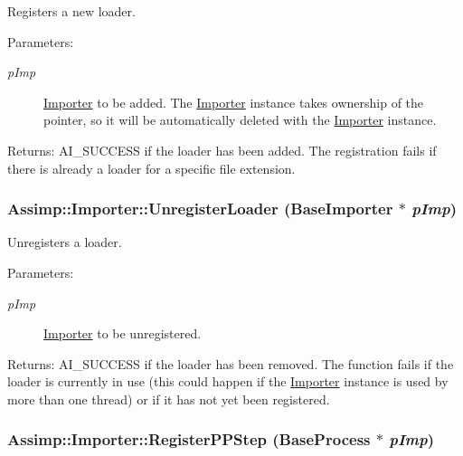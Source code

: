 Registers a new loader.

\begin{Desc}
\item[Parameters:]
\begin{description}
\item[{\em pImp}]\hyperlink{class_assimp_1_1_importer}{Importer} to be added. The \hyperlink{class_assimp_1_1_importer}{Importer} instance takes ownership of the pointer, so it will be automatically deleted with the \hyperlink{class_assimp_1_1_importer}{Importer} instance. \end{description}
\end{Desc}
\begin{Desc}
\item[Returns:]AI\_\-SUCCESS if the loader has been added. The registration fails if there is already a loader for a specific file extension. \end{Desc}
\hypertarget{class_assimp_1_1_importer_3b1f5af2c763b13aca0f324b19001722}{
\subsubsection[UnregisterLoader]{ Assimp::Importer::UnregisterLoader (BaseImporter $\ast$ {\em pImp})}}
\label{class_assimp_1_1_importer_3b1f5af2c763b13aca0f324b19001722}


Unregisters a loader.

\begin{Desc}
\item[Parameters:]
\begin{description}
\item[{\em pImp}]\hyperlink{class_assimp_1_1_importer}{Importer} to be unregistered. \end{description}
\end{Desc}
\begin{Desc}
\item[Returns:]AI\_\-SUCCESS if the loader has been removed. The function fails if the loader is currently in use (this could happen if the \hyperlink{class_assimp_1_1_importer_2c207299ed05f1db1ad1e6dab005f719}{Importer} instance is used by more than one thread) or if it has not yet been registered. \end{Desc}
\hypertarget{class_assimp_1_1_importer_102650d3648c0e414a1e73bdad9bed35}{
\subsubsection[RegisterPPStep]{ Assimp::Importer::RegisterPPStep (BaseProcess $\ast$ {\em pImp})}}
\label{class_assimp_1_1_importer_102650d3648c0e414a1e73bdad9bed35}


